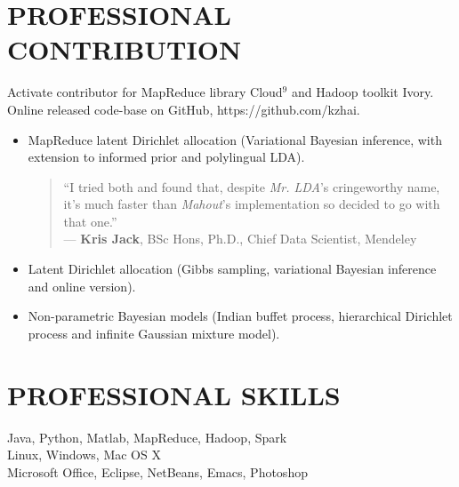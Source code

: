 \documentclass{style/resume}
\begin{document}
\begin{resume}
  \section{PROFESSIONAL CONTRIBUTION}
  \vspace{0.1in}
  Activate contributor for MapReduce library Cloud$^9$ and Hadoop toolkit Ivory.\\
  Online released code-base on GitHub, https://github.com/kzhai.
  \begin{itemize}
  \item MapReduce latent Dirichlet allocation (Variational Bayesian
    inference, with extension to informed prior and polylingual LDA).
    \begin{quotation}
      ``I tried both and found that, despite \emph{Mr. LDA}'s cringeworthy name, it's much faster than \emph{Mahout}'s implementation so decided to go with that one.''\\
      \vspace{1mm}
      \hfill --- \textbf{Kris Jack}, BSc Hons, Ph.D., Chief Data Scientist, Mendeley
    \end{quotation}
  \item Latent Dirichlet allocation (Gibbs sampling, variational Bayesian inference and online version).
  \item Non-parametric Bayesian models (Indian buffet process, hierarchical Dirichlet process and infinite Gaussian mixture model).
  \end{itemize}

  \section{PROFESSIONAL SKILLS}
  \vspace{0.1in}
  Java, Python, Matlab, MapReduce, Hadoop, Spark\\
  Linux, Windows, Mac OS X\\
  Microsoft Office, Eclipse, NetBeans, Emacs, Photoshop

\end{resume}
\end{document}
